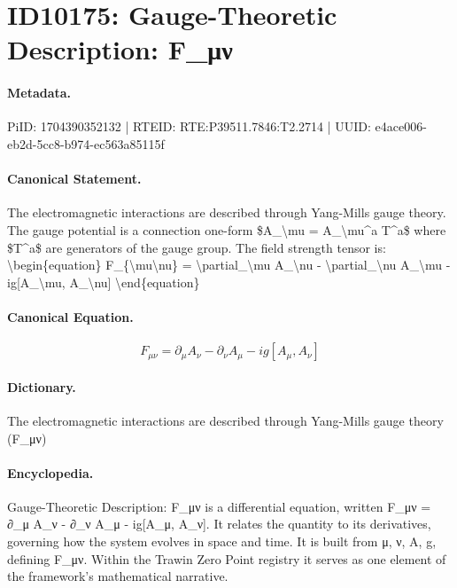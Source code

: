 \section*{ID10175: Gauge-Theoretic Description: F\_μν}
\paragraph{Metadata.}
PiID: 1704390352132 | RTEID: RTE:P39511.7846:T2.2714 | UUID: e4ace006-eb2d-5cc8-b974-ec563a85115f

\paragraph{Canonical Statement.}
The electromagnetic interactions are described through Yang-Mills gauge theory. The gauge potential is a connection one-form \$A\_\textbackslash{}mu = A\_\textbackslash{}mu\textasciicircum{}a T\textasciicircum{}a\$ where \$T\textasciicircum{}a\$ are generators of the gauge group. The field strength tensor is: \textbackslash{}begin\{equation\} F\_\{\textbackslash{}mu\textbackslash{}nu\} = \textbackslash{}partial\_\textbackslash{}mu A\_\textbackslash{}nu - \textbackslash{}partial\_\textbackslash{}nu A\_\textbackslash{}mu - ig[A\_\textbackslash{}mu, A\_\textbackslash{}nu] \textbackslash{}end\{equation\}

\paragraph{Canonical Equation.}
\[
F_{\mu\nu} = \partial_\mu A_\nu - \partial_\nu A_\mu - ig[A_\mu, A_\nu]
\]

\paragraph{Dictionary.}
The electromagnetic interactions are described through Yang-Mills gauge theory (F\_μν)

\paragraph{Encyclopedia.}
Gauge-Theoretic Description: F\_μν is a differential equation, written F\_μν = ∂\_μ A\_ν - ∂\_ν A\_μ - ig[A\_μ, A\_ν]. It relates the quantity to its derivatives, governing how the system evolves in space and time. It is built from μ, ν, A, g, defining F\_μν. Within the Trawin Zero Point registry it serves as one element of the framework's mathematical narrative.
